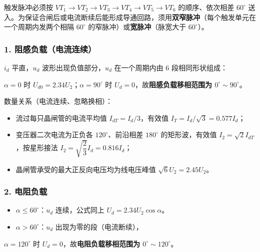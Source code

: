 触发脉冲必须按 $VT_1\to VT_2\to VT_3\to VT_4\to VT_5\to VT_6$ 的顺序、依次相差 $60^\circ$ 送入。为保证合闸后或电流断续后能形成导通回路，须用\textbf{双窄脉冲}（每个触发单元在一个周期内发两个相隔 $60^\circ$ 的窄脉冲）或\textbf{宽脉冲}（脉宽大于 $60^\circ$）。

\subsubsection*{1. 阻感负载（电流连续）}

$i_d$ 平直，$u_d$ 波形出现负值部分，$u_d$ 在一个周期内由 6 段相同形状组成：


$\alpha=0$ 时 $U_{d0}=2.34U_2$；$\alpha=90^\circ$ 时 $U_d=0$，故\textbf{阻感负载移相范围为 $0^\circ\sim90^\circ$}。

数量关系（电流连续、忽略换相）：
\begin{itemize}
  \item 流过每只晶闸管的电流平均值 $I_{dT}=I_d/3$，有效值 $I_T=I_d/\sqrt{3}=0.577I_d$；
  \item 变压器二次电流为正负各 $120^\circ$、前沿相差 $180^\circ$ 的矩形波，有效值 $I_2=\sqrt{2}I_{dT}$，按星形接法 $I_2=\sqrt{\dfrac{2}{3}}I_d=0.816I_d$；
  \item 晶闸管承受的最大正反向电压均为线电压峰值 $\sqrt{6}U_2=2.45U_2$。
\end{itemize}

\subsubsection*{2. 电阻负载}

\begin{itemize}
  \item $\alpha\le60^\circ$：$u_d$ 连续，公式同上 $U_d=2.34U_2\cos\alpha$。
  \item $\alpha>60^\circ$：$u_d$ 出现为零的段（电流断续），
\end{itemize}


$\alpha=120^\circ$ 时 $U_d=0$，故\textbf{电阻负载移相范围为 $0^\circ\sim120^\circ$}。


